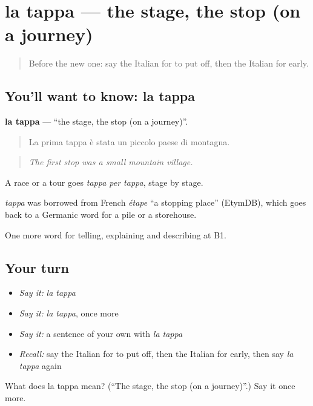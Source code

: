 \section[la tappa]{la tappa — the stage, the stop (on a journey)}

\label{lesson:IT-C279-tappa}



\begin{quote}
Before the new one: say the Italian for to put off, then the Italian for early.
\end{quote}

\subsection*{You'll want to know: la tappa}
\textbf{la tappa} — \textquotedblleft{}the stage, the stop (on a journey)\textquotedblright{}.

\begin{quote}
La prima tappa è stata un piccolo paese di montagna.
\end{quote}

\begin{quote}
\emph{The first stop was a small mountain village.}
\end{quote}

A race or a tour goes \emph{tappa per tappa}, stage by stage.

\begin{cousinweb}
\emph{tappa} was borrowed from French \emph{étape} \textquotedblleft{}a stopping place\textquotedblright{} (EtymDB), which goes back to a Germanic word for a pile or a storehouse.
\end{cousinweb}

\begin{grammarlens}[title={What you've built}]
One more word for telling, explaining and describing at B1.
\end{grammarlens}

\subsection*{Your turn}
\begin{itemize}
\raggedright
  \item \emph{Say it:} \emph{la tappa}
  \item \emph{Say it:} \emph{la tappa}, once more
  \item \emph{Say it:} a sentence of your own with \emph{la tappa}
  \item \emph{Recall:} say the Italian for to put off, then the Italian for early, then say \emph{la tappa} again
\end{itemize}

\begin{tcolorbox}[breakable,colback=teal!4,colframe=teal!35!black,title={Before you move on}]
What does la tappa mean? (\textquotedblleft{}The stage, the stop (on a journey)\textquotedblright{}.) Say it once more.
\end{tcolorbox}
